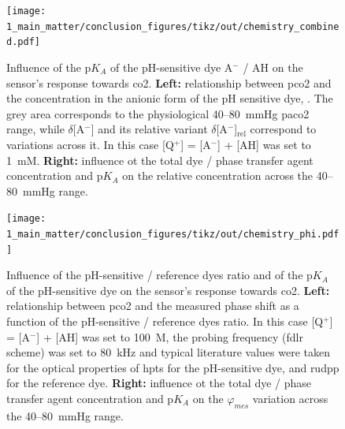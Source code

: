 \begin{figure} %
	\centering
	\texttt{[image: 1\_main\_matter/conclusion\_figures/tikz/out/chemistry\_combined.pdf]}
	\caption[Influence of the p$K_A$ of the pH-sensitive dye on the sensor's response towards \gls{co2}.]{Influence of the p$K_A$ of the pH-sensitive dye A$^-$ / AH on the sensor's response towards \gls{co2}. \textbf{Left:} relationship between \gls{pco2} and the concentration in the anionic form of the pH sensitive dye, . The grey area corresponds to the physiological 40--80~mmHg \gls{paco2} range, while $\delta$[A$^-$] and its relative variant $\delta$[A$^-$]$_\text{rel}$ correspond to \ce{[A^-]} variations across it. In this case [Q$^+$] = [A$^-$] + [AH] was set to 1~mM. \textbf{Right:} influence ot the total dye / phase transfer agent concentration and p$K_A$ on the relative  concentration across the 40--80~mmHg range.}
	\label{fig:conclusion:chemistry_combined}
\end{figure}

\begin{figure} %
	\centering
	\texttt{[image: 1\_main\_matter/conclusion\_figures/tikz/out/chemistry\_phi.pdf]}
	\caption[Influence of the p$K_A$ and dyes ratio on the sensor's response towards \gls{co2}.]{Influence of the pH-sensitive / reference dyes ratio and of the p$K_A$ of the pH-sensitive dye on the sensor's response towards \gls{co2}. \textbf{Left:} relationship between \gls{pco2} and the measured phase shift as a function of the pH-sensitive / reference dyes ratio. In this case [Q$^+$] = [A$^-$] + [AH] was set to 100~\textmu{}M, the probing frequency (\gls{fdlr} scheme) was set to 80~kHz and typical literature values were taken for the optical properties of \gls{hpts} for the pH-sensitive dye, and \gls{rudpp} for the reference dye. \textbf{Right:} influence ot the total dye / phase transfer agent concentration and p$K_A$ on the $\varphi_{mes}$ variation across the 40--80~mmHg range.}
	\label{fig:conclusion:chemistry_phi}
\end{figure}

